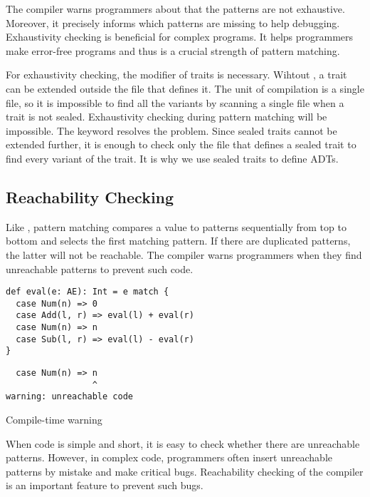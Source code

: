 The compiler warns programmers about that the patterns are not exhaustive. Moreover, it precisely
informs which patterns are missing to help debugging.
Exhaustivity checking is beneficial for complex programs. It helps programmers make
error-free programs and thus is a crucial strength of pattern matching.

For exhaustivity checking, the  modifier of traits is necessary.
Wihtout , a trait can be extended outside the file that defines it.
The unit of compilation is a single file, so it is impossible to find
all the variants by scanning a single file when a trait is not sealed.
Exhaustivity checking during pattern matching will be impossible.
The  keyword resolves the problem. Since sealed traits cannot be
extended further, it is enough to check only the file that defines a sealed trait to find
every variant of the trait. It is why we use sealed traits to define ADTs.

\subsection{Reachability Checking}

Like , pattern
matching compares a value to patterns sequentially from top to bottom and selects
the first matching pattern. If there are duplicated patterns, the latter will
not be reachable.
The compiler warns programmers when they find unreachable patterns to prevent such code.

\begin{verbatim}
def eval(e: AE): Int = e match {
  case Num(n) => 0
  case Add(l, r) => eval(l) + eval(r)
  case Num(n) => n
  case Sub(l, r) => eval(l) - eval(r)
}
\end{verbatim}
\vspace{-1em}
\begin{mdframed}[hidealllines=true,backgroundcolor=yellow!10,innerleftmargin=3pt,innerrightmargin=3pt,leftmargin=-3pt,rightmargin=-3pt]
\begin{verbatim}
  case Num(n) => n
                 ^
warning: unreachable code
\end{verbatim}
\vspace{-2em}
\begin{flushright}
\scriptsize\textsf{Compile-time warning}
\end{flushright}
\end{mdframed}

When code is simple and short, it is easy to check whether there are unreachable
patterns. However, in complex code, programmers often insert unreachable
patterns by mistake and make critical bugs. Reachability checking of the
compiler is an important feature to prevent such bugs.

